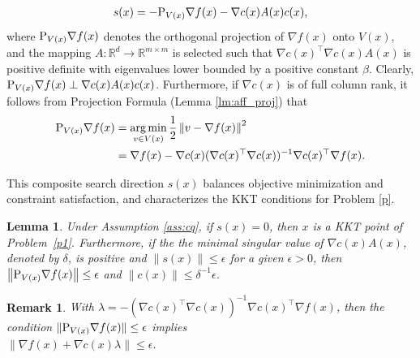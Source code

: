 \documentclass[11pt]{article}
\newtheorem{remark}{Remark}
\newcommand{\R}{\mathbb{R}}
\newcommand{\norm}[1]{\left \lVert #1 \right \rVert}
\newcommand{\argmin}{\mathop{\mathrm{arg\,min}}}
\newtheorem{lemma}{Lemma}
\begin{document}
\begin{align}
s(x) = - {\rm P}_{V(x)} \nabla f(x) - \nabla c(x) A(x) c(x),
\label{eq:orth_field}
\end{align}
where \( {\rm P}_{V(x)} \nabla f(x) \) denotes the orthogonal projection of \(\nabla f(x)\) onto \( V(x) \), and the mapping  \( A:\R^d\to  \mathbb{R}^{m \times m} \) is selected such that
$ \nabla c(x)^{\top} \nabla c(x) A(x) $ is positive definite with eigenvalues lower bounded by a positive constant $\beta$. {Clearly, \( {\rm P}_{V(x)} \nabla f(x) \perp \nabla c(x) A(x) c(x)\).} Furthermore, if  $\nabla c(x)$ is of full {column} rank,  it follows from Projection Formula (Lemma \ref{lm:aff_proj}) that 
\begin{equation}\label{eq:proj_auxtan}
\begin{aligned}
    {\rm P}_{V(x)} \nabla f(x) &= \argmin_{v \in V(x)} \frac{1}{2} \norm{v - \nabla f(x)}^2 \\
    & = \nabla f(x) - \nabla c(x) (\nabla c(x)^{\top} \nabla c(x))^{-1} \nabla c(x)^{\top} \nabla f(x).
\end{aligned}
\end{equation}


This composite {search direction} \(s(x)\) balances objective minimization and constraint satisfaction, and characterizes the KKT conditions for Problem \eqref{p}.
\begin{lemma}\label{lm:OF_crit}
{Under Assumption \ref{ass:cq},} if $s(x) = 0$, then $x$ is a KKT point of Problem~\eqref{p1}. Furthermore, if the the minimal singular value of $\nabla c(x) A(x)$, denoted by $\delta$, is positive and $\norm{s(x)} \leq \epsilon$ for a given $\epsilon>0$, then $\norm{{\rm P}_{V(x)} \nabla f(x)} \leq \epsilon$ and $\norm{c(x)} \leq \delta^{-1}\epsilon$. %
\end{lemma}
\begin{remark}\label{rm:OF_crit}
     With \(\lambda = - (\nabla c(x)^{\top} \nabla c(x))^{-1} \nabla c(x)^{\top} \nabla f(x)\), then the condition $\|{\rm P}_{V(x)} \nabla f(x)\| \leq \epsilon$ implies\\ $\norm{\nabla f(x) + \nabla c(x) \lambda} \leq \epsilon$.
\end{remark}
\end{document}
